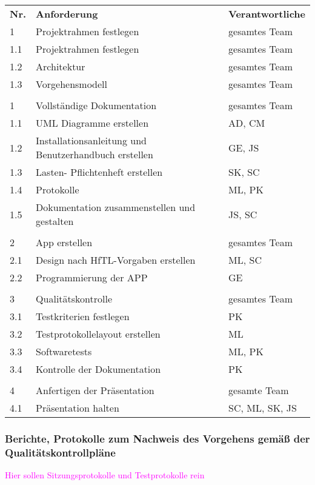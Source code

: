 \begin{tabular}{lll}
	\textbf{Nr.} & \textbf{Anforderung} & \textbf{Verantwortliche} \\
	1 & Projektrahmen festlegen & gesamtes Team \\
	1.1 & Projektrahmen festlegen & gesamtes Team \\
	1.2 & Architektur & gesamtes Team \\
	1.3 & Vorgehensmodell & gesamtes Team \\
	\\
	1 & Vollständige Dokumentation & gesamtes Team \\
	1.1 & UML Diagramme erstellen & AD, CM \\
	1.2 & Installationsanleitung und Benutzerhandbuch erstellen & GE, JS \\
	1.3 & Lasten- Pflichtenheft erstellen & SK, SC \\
	1.4 & Protokolle & ML, PK \\
	1.5 & Dokumentation zusammenstellen und gestalten & JS, SC \\
	\\
	2 & App erstellen & gesamtes Team \\
	2.1 & Design nach HfTL-Vorgaben erstellen & ML, SC \\
	2.2 & Programmierung der APP & GE \\	
	\\
	3 & Qualitätskontrolle & gesamtes Team \\
	3.1 & Testkriterien festlegen & PK \\
	3.2 & Testprotokollelayout erstellen & ML \\
	3.3 & Softwaretests & ML, PK \\
	3.4 & Kontrolle der Dokumentation & PK \\
	\\
	4 & Anfertigen der Präsentation & gesamte Team \\
	4.1 & Präsentation halten & SC, ML, SK, JS \\
\end{tabular}



\subsubsection{Berichte, Protokolle zum Nachweis des Vorgehens gemäß der Qualitätskontrollpläne}
\textcolor{magenta}{Hier sollen Sitzungsprotokolle und Testprotokolle rein}



